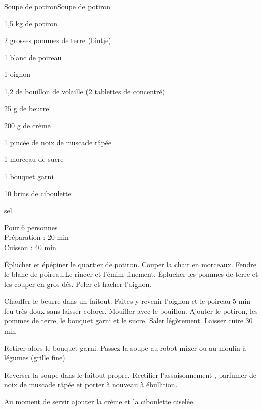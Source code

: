 \begin{recette}{Soupe de potiron}{Soupe de potiron}

\begin{ingredients}
1,5 kg de potiron\par
2 grosses pommes de terre (bintje)\par
1 blanc de poireau\par
1 oignon\par
1,2 de bouillon de volaille (2 tablettes de concentré)\par
25 g de beurre\par
200 g de crème\par
1 pincée de noix de muscade râpée\par
1 morceau de sucre\par
1 bouquet garni\par
10 brins de ciboulette\par
sel\par
\end{ingredients}

\begin{infos}
Pour 6 personnes\\
Préparation : 20 min\\
Cuisson : 40 min\\
\end{infos}

\begin{etapes}
\item Éplucher et épépiner le quartier de potiron. Couper la chair en morceaux. Fendre le blanc de poireau.Le rincer et l'éminr finement. Éplucher les pommes de terre et les couper en gros dés. Peler et hacher l’oignon.
\item Chauffer le beurre dans un faitout. Faites-y revenir l’oignon et le poireau 5 min feu très doux sans laisser colorer. Mouiller avec le bouillon. Ajouter le potiron, les pommes de terre, le bouquet garni et le sucre. Saler légèrement. Laisser cuire 30 min
\item Retirer  alors le bouquet garni. Passez la soupe au robot-mixer ou au moulin à légumes (grille fine).
\item Reverser la soupe dans le faitout propre. Rectifier l’assaisonnement , parfumer de noix de muscade râpée et porter à nouveau à ébullition.
\item Au moment de servir ajouter la crème et la ciboulette ciselée.
\end{etapes}

\end{recette}
